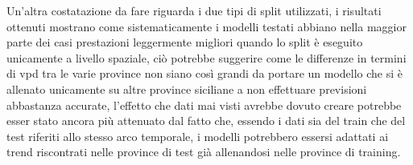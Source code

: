 Un'altra costatazione da fare riguarda i due tipi di split utilizzati, i risultati ottenuti mostrano come sistematicamente i modelli testati abbiano nella maggior parte dei casi prestazioni leggermente migliori quando lo split è eseguito unicamente a livello spaziale, ciò potrebbe suggerire come le differenze in termini di vpd tra le varie province non siano così grandi da portare un modello che si è allenato unicamente su altre province siciliane a non effettuare previsioni abbastanza accurate, l'effetto che dati mai visti avrebbe dovuto creare potrebbe esser stato ancora più attenuato dal fatto che, essendo i dati sia del train che del test riferiti allo stesso arco temporale, i modelli potrebbero essersi adattati ai trend riscontrati nelle province di test già allenandosi nelle province di training.

\label{sec:results}